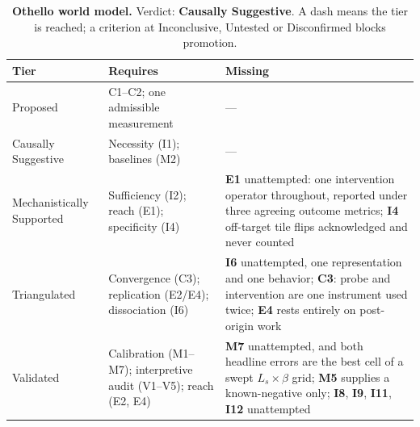 \begin{table}[H]
\centering
\footnotesize
\caption{\textbf{Othello world model.} Verdict: \textbf{Causally Suggestive}. A dash means the tier is reached; a criterion at
Inconclusive, Untested or Disconfirmed blocks promotion.}
\label{tab:othello-verdict}
\renewcommand{\arraystretch}{1.18}
\begin{tabular}{@{}l>{\raggedright\arraybackslash}p{3.6cm}>{\raggedright\arraybackslash}p{4.4cm}@{}}
\toprule
\textbf{Tier} & \textbf{Requires} & \textbf{Missing} \\
\midrule
Proposed & C1--C2; one admissible measurement & --- \\
\addlinespace[2pt]
Causally Suggestive & Necessity (I1); baselines (M2) & --- \\
\addlinespace[2pt]
Mechanistically Supported & Sufficiency (I2); reach (E1); specificity (I4) & \textbf{E1} unattempted: one intervention operator throughout, reported under three agreeing outcome metrics; \textbf{I4} off-target tile flips acknowledged and never counted \\
\addlinespace[2pt]
Triangulated & Convergence (C3); replication (E2/E4); dissociation (I6) & \textbf{I6} unattempted, one representation and one behavior; \textbf{C3}: probe and intervention are one instrument used twice; \textbf{E4} rests entirely on post-origin work \\
\addlinespace[2pt]
Validated & Calibration (M1--M7); interpretive audit (V1--V5); reach (E2, E4) & \textbf{M7} unattempted, and both headline errors are the best cell of a swept $L_s \times \beta$ grid; \textbf{M5} supplies a known-negative only; \textbf{I8}, \textbf{I9}, \textbf{I11}, \textbf{I12} unattempted \\
\bottomrule
\end{tabular}
\end{table}

